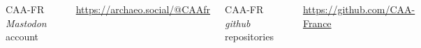 \documentclass[xcolor=dvipsnames, 10pt, french, american]{beamer}
\begin{document}
\begin{frame}
     \begin{columns}[t]
            CAA-FR \emph{Mastodon} account\medskip
            
            \includegraphics[height=0.5\textheight]{figures/caa-fr-mastodon}\medskip
            
            \url{https://archaeo.social/@CAAfr}
    	
            CAA-FR \emph{github} repositories\medskip
            
            \includegraphics[height=0.5\textheight]{figures/caa-fr-github}\medskip
            
            \url{https://github.com/CAA-France}
    \end{columns}
\end{frame}
\end{document}
